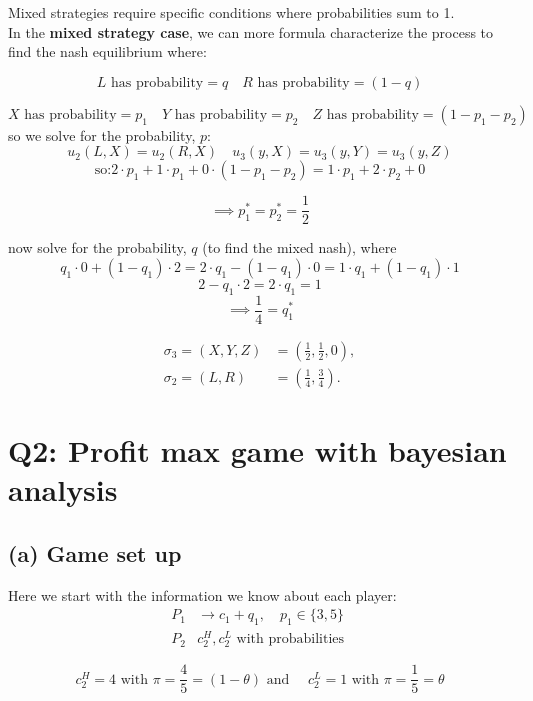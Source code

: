 \documentclass{article}
\begin{document}
\hspace{3mm}
\vspace{2mm}
Mixed strategies require specific conditions where probabilities sum to 1. \\
\vspace{2mm}
In the \textbf{mixed strategy case}, we can more formula characterize the process to find the nash equilibrium where:

\[ L \text{ has probability} = q \quad 
R \text{ has probability} = (1-q)
\]

\[ X \text{ has probability} = p_1 \quad 
Y \text{ has probability} = p_2 \quad 
Z \text{ has probability} = (1-p_{1}-p_{2})
\]
so we solve for the probability, $p$:
\[
u_2(L,X) = u_2(R,X) \quad u_3(y,X) = u_3(y,Y) = u_3(y,Z)
\]
\[
\text{so:} 2\cdot p_1 + 1 \cdot p_1 + 0\cdot (1-p_1 - p_2) = 1\cdot p_1 + 2 \cdot p_2 + 0 
\]

\[
\implies p^{*}_1 = p^{*}_2 = \frac{1}{2}
\]

now solve for the probability, $q$ (to find the mixed nash), where 
\[
q_1\cdot 0 + (1- q_1) \cdot 2 = 2 \cdot q_1  - (1-q_1) \cdot 0 = 1 \cdot q_1 + (1-q_1) \cdot 1
\]
\[
2 - q_1\cdot 2  = 2 \cdot q_1  = 1
\]
\[ \implies \frac{1}{4} = q^{*}_1 \]

\begin{align*}
    \sigma_3 = (X, Y, Z) &= \left(\frac{1}{2}, \frac{1}{2}, 0\right), \\
    \sigma_2 =  (L, R) &= \left(\frac{1}{4}, \frac{3}{4}\right).
\end{align*}

\section*{Q2: Profit max game with bayesian analysis}

\subsection*{(a) Game set up}
Here we start with the information we know about each player: 
\begin{align*}
    P_1 & \to c_1 + q_1, \quad p_1 \in \{3,5\} \\
    P_2 & c_2^H, c_2^L \text{ with probabilities } 
\end{align*}

\[
c_2^H = 4 \text{ with } \pi = \frac{4}{5} =  (1 - \theta) \text{ and } \quad c_2^L = 1 \text{ with } \pi = \frac{1}{5} = \theta
\]

\vspace{2mm}
\end{document}
